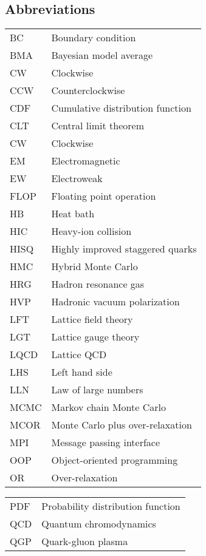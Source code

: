 \documentclass[12pt]{book}
\theoremstyle{definition}
\newenvironment{frontstuff}
  {\centering\chapter*{}}
  {\clearpage}
\begin{document}
\begin{frontstuff}
\section*{Abbreviations}
\begin{tabular}{ll}
BC      &       Boundary condition \\
BMA     &       Bayesian model average \\
CW      &       Clockwise \\
CCW     &       Counterclockwise\\
CDF     &       Cumulative distribution function \\
CLT     &       Central limit theorem\\
CW      &       Clockwise\\
EM      &       Electromagnetic\\
EW      &       Electroweak\\
FLOP    &       Floating point operation\\
HB      &       Heat bath\\
HIC     &       Heavy-ion collision\\
HISQ    &       Highly improved staggered quarks\\
HMC     &       Hybrid Monte Carlo\\
HRG     &       Hadron resonance gas\\
HVP     &       Hadronic vacuum polarization\\
LFT     &       Lattice field theory\\
LGT     &       Lattice gauge theory\\
LQCD    &       Lattice QCD\\
LHS     &       Left hand side\\
LLN     &       Law of large numbers\\
MCMC    &       Markov chain Monte Carlo\\
MCOR    &       Monte Carlo plus over-relaxation \\
MPI     &       Message passing interface \\
OOP     &       Object-oriented programming \\
OR      &       Over-relaxation\\
\end{tabular}
\clearpage
\begin{tabular}{ll}
PDF     &       Probability distribution function \\
QCD     &       Quantum chromodynamics \\
QGP     &       Quark-gluon plasma \\

\end{tabular}
\end{frontstuff}
\end{document}
